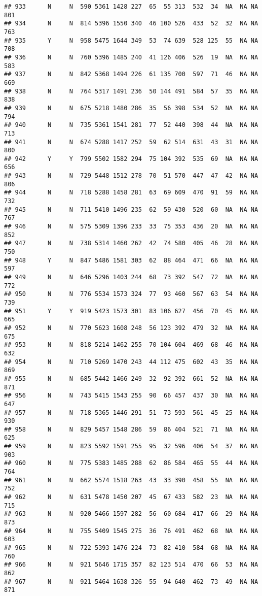 \documentclass[]{article}
\begin{document}
\begin{verbatim}
## 933      N     N  590 5361 1428 227  65  55 313  532  34  NA  NA NA  801
## 934      N     N  814 5396 1550 340  46 100 526  433  52  32  NA NA  763
## 935      Y     N  958 5475 1644 349  53  74 639  528 125  55  NA NA  708
## 936      N     N  760 5396 1485 240  41 126 406  526  19  NA  NA NA  583
## 937      N     N  842 5368 1494 226  61 135 700  597  71  46  NA NA  669
## 938      N     N  764 5317 1491 236  50 144 491  584  57  35  NA NA  838
## 939      N     N  675 5218 1480 286  35  56 398  534  52  NA  NA NA  794
## 940      N     N  735 5361 1541 281  77  52 440  398  44  NA  NA NA  713
## 941      N     N  674 5288 1417 252  59  62 514  631  43  31  NA NA  800
## 942      Y     Y  799 5502 1582 294  75 104 392  535  69  NA  NA NA  656
## 943      N     N  729 5448 1512 278  70  51 570  447  47  42  NA NA  806
## 944      N     N  718 5288 1458 281  63  69 609  470  91  59  NA NA  732
## 945      N     N  711 5410 1496 235  62  59 430  520  60  NA  NA NA  767
## 946      N     N  575 5309 1396 233  33  75 353  436  20  NA  NA NA  852
## 947      N     N  738 5314 1460 262  42  74 580  405  46  28  NA NA  750
## 948      Y     N  847 5486 1581 303  62  88 464  471  66  NA  NA NA  597
## 949      N     N  646 5296 1403 244  68  73 392  547  72  NA  NA NA  772
## 950      N     N  776 5534 1573 324  77  93 460  567  63  54  NA NA  739
## 951      Y     Y  919 5423 1573 301  83 106 627  456  70  45  NA NA  665
## 952      N     N  770 5623 1608 248  56 123 392  479  32  NA  NA NA  675
## 953      N     N  818 5214 1462 255  70 104 604  469  68  46  NA NA  632
## 954      N     N  710 5269 1470 243  44 112 475  602  43  35  NA NA  869
## 955      N     N  685 5442 1466 249  32  92 392  661  52  NA  NA NA  871
## 956      N     N  743 5415 1543 255  90  66 457  437  30  NA  NA NA  647
## 957      N     N  718 5365 1446 291  51  73 593  561  45  25  NA NA  930
## 958      N     N  829 5457 1548 286  59  86 404  521  71  NA  NA NA  625
## 959      N     N  823 5592 1591 255  95  32 596  406  54  37  NA NA  903
## 960      N     N  775 5383 1485 288  62  86 584  465  55  44  NA NA  764
## 961      N     N  662 5574 1518 263  43  33 390  458  55  NA  NA NA  752
## 962      N     N  631 5478 1450 207  45  67 433  582  23  NA  NA NA  715
## 963      N     N  920 5466 1597 282  56  60 684  417  66  29  NA NA  873
## 964      N     N  755 5409 1545 275  36  76 491  462  68  NA  NA NA  603
## 965      N     N  722 5393 1476 224  73  82 410  584  68  NA  NA NA  760
## 966      N     N  921 5646 1715 357  82 123 514  470  66  53  NA NA  862
## 967      N     N  921 5464 1638 326  55  94 640  462  73  49  NA NA  871

\end{verbatim}
\end{document}

